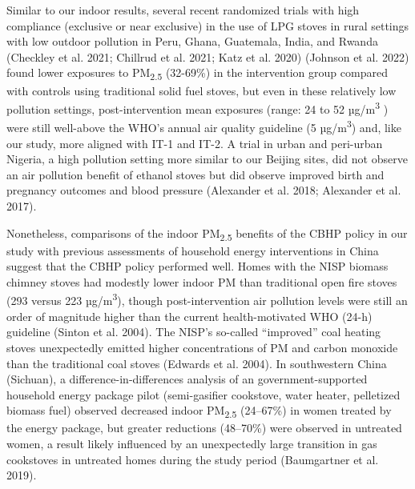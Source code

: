 \documentclass[
  letterpaper,
  DIV=11,
  numbers=noendperiod]{scrartcl}
\begin{document}
Similar to our indoor results, several recent randomized trials with
high compliance (exclusive or near exclusive) in the use of LPG stoves
in rural settings with low outdoor pollution in Peru, Ghana, Guatemala,
India, and Rwanda (Checkley et al. 2021; Chillrud et al. 2021; Katz et
al. 2020) (Johnson et al. 2022) found lower exposures to
PM\textsubscript{2.5} (32-69\%) in the intervention group compared with
controls using traditional solid fuel stoves, but even in these
relatively low pollution settings, post-intervention mean exposures
(range: 24 to 52 µg/m\textsuperscript{3} ) were still well-above the
WHO's annual air quality guideline (5 µg/m\textsuperscript{3}) and, like
our study, more aligned with IT-1 and IT-2. A trial in urban and
peri-urban Nigeria, a high pollution setting more similar to our Beijing
sites, did not observe an air pollution benefit of ethanol stoves but
did observe improved birth and pregnancy outcomes and blood pressure
(Alexander et al. 2018; Alexander et al. 2017).

Nonetheless, comparisons of the indoor PM\textsubscript{2.5} benefits of
the CBHP policy in our study with previous assessments of household
energy interventions in China suggest that the CBHP policy performed
well. Homes with the NISP biomass chimney stoves had modestly lower
indoor PM than traditional open fire stoves (293 versus 223
µg/m\textsuperscript{3}), though post-intervention air pollution levels
were still an order of magnitude higher than the current
health-motivated WHO (24-h) guideline (Sinton et al. 2004). The NISP's
so-called ``improved'' coal heating stoves unexpectedly emitted higher
concentrations of PM and carbon monoxide than the traditional coal
stoves (Edwards et al. 2004). In southwestern China (Sichuan), a
difference-in-differences analysis of an government-supported household
energy package pilot (semi-gasifier cookstove, water heater, pelletized
biomass fuel) observed decreased indoor PM\textsubscript{2.5} (24--67\%)
in women treated by the energy package, but greater reductions
(48--70\%) were observed in untreated women, a result likely influenced
by an unexpectedly large transition in gas cookstoves in untreated homes
during the study period (Baumgartner et al. 2019).
\end{document}
